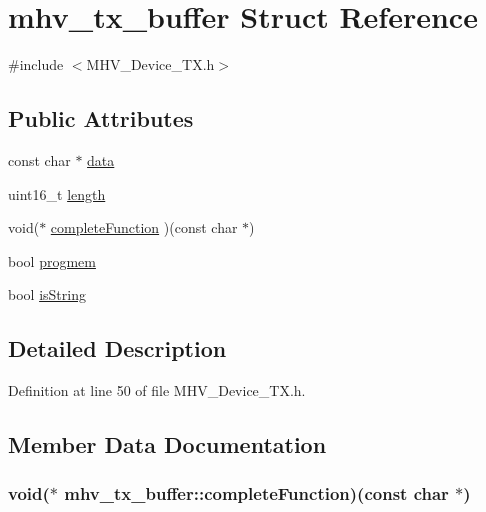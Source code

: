 \hypertarget{structmhv__tx__buffer}{
\section{mhv\-\_\-tx\-\_\-buffer \-Struct \-Reference}
\label{structmhv__tx__buffer}
}


{\ttfamily \#include $<$\-M\-H\-V\-\_\-\-Device\-\_\-\-T\-X.\-h$>$}

\subsection*{\-Public \-Attributes}
\begin{DoxyCompactItemize}
\item 
const char $\ast$ \hyperlink{structmhv__tx__buffer_a7523481b7a0b1d4972a79a4de6e528af}{data}
\item 
uint16\-\_\-t \hyperlink{structmhv__tx__buffer_ac05ef0da2f6fce474bec691e8e1fb4e2}{length}
\item 
void($\ast$ \hyperlink{structmhv__tx__buffer_a1a50cf4d4aba22fe7d519832fa1d61ff}{complete\-Function} )(const char $\ast$)
\item 
bool \hyperlink{structmhv__tx__buffer_a0b9b692bdd3d83c9a53e19a5c951fb74}{progmem}
\item 
bool \hyperlink{structmhv__tx__buffer_a945fe73e41c397f3c4f7765c97469a35}{is\-String}
\end{DoxyCompactItemize}


\subsection{\-Detailed \-Description}


\-Definition at line 50 of file \-M\-H\-V\-\_\-\-Device\-\_\-\-T\-X.\-h.



\subsection{\-Member \-Data \-Documentation}
\hypertarget{structmhv__tx__buffer_a1a50cf4d4aba22fe7d519832fa1d61ff}{
\subsubsection[{complete\-Function}]{\setlength{\rightskip}{0pt plus 5cm}void($\ast$ {\bf mhv\-\_\-tx\-\_\-buffer\-::complete\-Function})(const char $\ast$)}}
\label{structmhv__tx__buffer_a1a50cf4d4aba22fe7d519832fa1d61ff}


